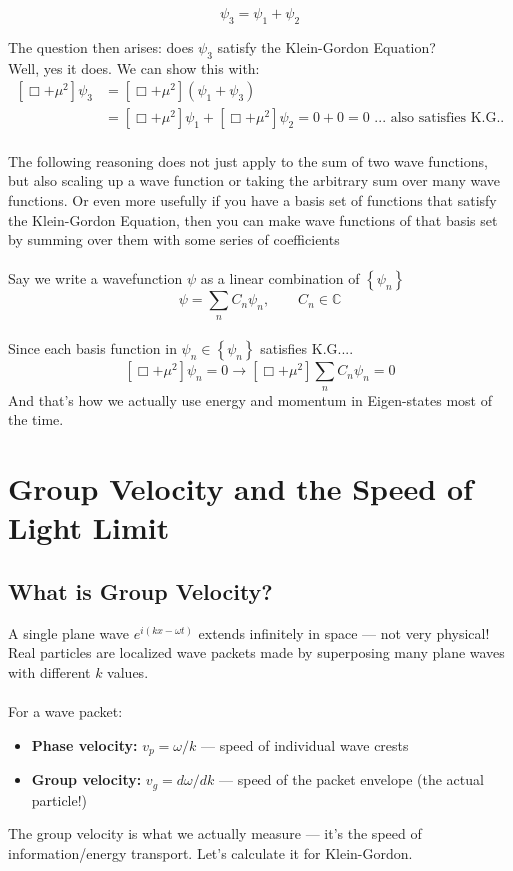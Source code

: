 \documentclass{report}
\begin{document}
\begin{equation}
	\psi_{3} = \psi_1 + \psi_2
\end{equation}

The question then arises: does $\displaystyle \psi_3$ satisfy the Klein-Gordon Equation?\\
Well, yes it does. We can show this with:
\begin{align*}
	\left[ \Box + \mu^2 \right]\psi_3 & = \left[ \Box + \mu^2 \right]\left( \psi_1 + \psi_3 \right)                                                          \\
	                                  & = \left[ \Box + \mu^2 \right] \psi_1 + \left[ \Box + \mu^2 \right]\psi_2 = 0 + 0 = 0 \text{ ... also satisfies K.G.}
	.\end{align*}
\\
The following reasoning does not just apply to the sum of two wave functions, but also scaling up a wave function or taking the arbitrary sum over many wave functions. Or even more usefully if you have a basis set of functions that satisfy the Klein-Gordon Equation, then you can make wave functions of that basis set by summing over them with some series of coefficients
\\
\\
Say we write a wavefunction $\psi$ as a linear combination of $\displaystyle \left\{ \psi_{n} \right\} $
\begin{equation}
	\psi = \sum_{n} C_{n}\psi_{n}, \qquad C_{n} \in \mathbb{C}
\end{equation}
\\
Since each basis function in $\displaystyle \psi_{n} \in \left\{ \psi_{n} \right\}$ satisfies K.G....
\begin{equation}
	\left[ \Box + \mu^2 \right] \psi_{n} = 0 \to \left[ \Box + \mu^2 \right]\sum_{n} C_{n} \psi_{n} = 0
\end{equation}
And that's how we actually use energy and momentum in Eigen-states most of the time.

\chapter{Group Velocity and the Speed of Light Limit}
\section{What is Group Velocity?}
A single plane wave $e^{i(kx - \omega t)}$ extends infinitely in space --- not very physical! Real particles are localized wave packets made by superposing many plane waves with different $k$ values.\\
\\
For a wave packet:
\begin{itemize}
	\item \textbf{Phase velocity:} $v_p = \omega/k$ --- speed of individual wave crests
	\item \textbf{Group velocity:} $v_g = d\omega/dk$ --- speed of the packet envelope (the actual particle!)
\end{itemize}
The group velocity is what we actually measure --- it's the speed of information/energy transport. Let's calculate it for Klein-Gordon.
\end{document}
